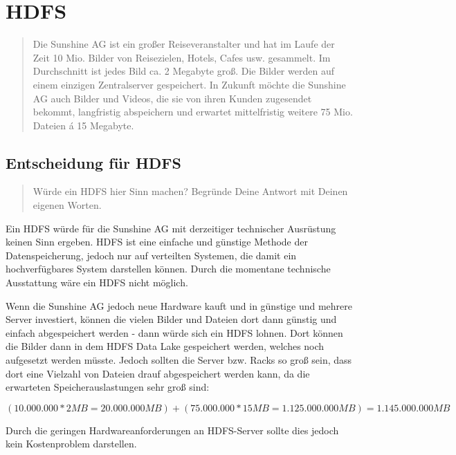 \chapter{HDFS}
\begin{quote}
    Die Sunshine AG ist ein großer Reiseveranstalter und hat im Laufe der Zeit 10 Mio. Bilder von Reisezielen, Hotels, Cafes usw. gesammelt. Im Durchschnitt ist jedes Bild ca. 2 Megabyte groß. Die Bilder werden auf einem einzigen Zentralserver gespeichert. In Zukunft möchte die Sunshine AG auch Bilder und Videos, die sie von ihren Kunden zugesendet bekommt, langfristig abspeichern und erwartet mittelfristig weitere 75 Mio. Dateien á 15 Megabyte.
\end{quote}

\section{Entscheidung für HDFS}
\begin{quote}
    Würde ein HDFS hier Sinn machen? Begründe Deine Antwort mit Deinen eigenen Worten.
\end{quote}
Ein HDFS würde für die Sunshine AG mit derzeitiger technischer Ausrüstung keinen Sinn ergeben. HDFS ist eine einfache und günstige Methode der Datenspeicherung, jedoch nur auf verteilten Systemen, die damit ein hochverfügbares System darstellen können. Durch die momentane technische Ausstattung wäre ein HDFS nicht möglich. 

Wenn die Sunshine AG jedoch neue Hardware kauft und in günstige und mehrere Server investiert, können die vielen Bilder und Dateien dort dann günstig und einfach abgespeichert werden - dann würde sich ein HDFS lohnen. Dort können die Bilder dann in dem HDFS Data Lake gespeichert werden, welches noch aufgesetzt werden müsste. Jedoch sollten die Server bzw. Racks so groß sein, dass dort eine Vielzahl von Dateien drauf abgespeichert werden kann, da die erwarteten Speicherauslastungen sehr groß sind:

    $(10.000.000 * 2 MB = 20.000.000 MB) + (75.000.000 * 15 MB = 1.125.000.000 MB) = 1.145.000.000 MB$
    
Durch die geringen Hardwareanforderungen an HDFS-Server sollte dies jedoch kein Kostenproblem darstellen.


